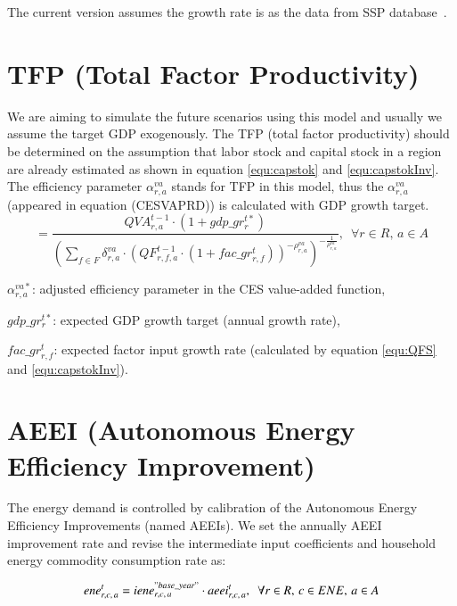 \documentclass[10pt,a4paper,titlepage,dvipdfmx]{book}
\begin{document}
The current version assumes the growth rate is as the data from SSP database~\cite{RN2762}.

\section{\label{sec:TFP}TFP (Total Factor Productivity)}

We are aiming to simulate the future scenarios using this model and usually we assume the target GDP exogenously. The TFP (total factor productivity) should be determined on the assumption that labor stock and capital stock in a region are already estimated as shown in equation \ref{equ:capstok} and \ref{equ:capstokInv}. The efficiency parameter $\alpha _{r,a}^{va}$ stands for TFP in this model, thus the $\alpha _{r,a}^{va}$ (appeared in equation (CESVAPRD)) is calculated with GDP growth target.
\begin{equation}
\label{equ:TFP}
=\frac{QVA_{r,a}^{t-1}\cdot \left(1+gdp\_ gr_{r}^{t*}\right)}{\left(\sum _{f\in F}\delta _{r,a}^{va}\cdot \left(QF_{r,f,a}^{t-1}\cdot \left(1+fac\_ gr_{r,f}^{t}\right)\right)^{-\rho _{r,a}^{va}}\right)^{-\frac{1}{\rho _{r,a}^{va}}}},\,\,\,\forall r\in R,\,a\in A
\end{equation}

\begin{flushleft}
$\alpha _{r,a}^{va*}$: adjusted efficiency parameter in the CES value-added function,

$gdp\_ gr_{r}^{t*}$: expected GDP growth target (annual growth rate),

$fac\_ gr_{r,f}^{t}$: expected factor input growth rate (calculated by equation \ref{equ:QFS} and \ref{equ:capstokInv}).
\end{flushleft}

\section{\label{sec:AEEI}AEEI (Autonomous Energy Efficiency Improvement)}

The energy demand is controlled by calibration of the Autonomous Energy Efficiency Improvements (named AEEIs). We set the annually AEEI improvement rate and revise the intermediate input coefficients and household energy commodity consumption rate as:

\begin{equation}
\label{equ:eneinp1}
ene_{r,c,\,a}^{t}=iene_{r,c,\,a}^{"base\_ year"}\cdot aeei_{r,c,\,a}^{t},\,\,\,\forall r\in R,\,c\in ENE,\,a\in A \\
\end{equation}
\end{document}
